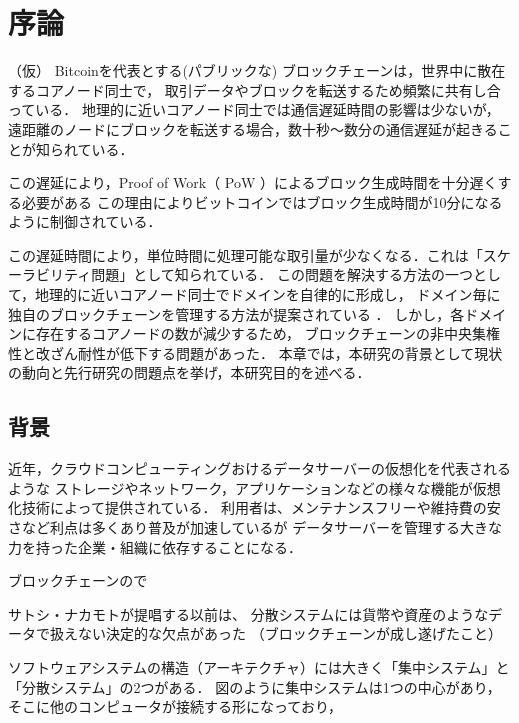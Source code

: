 \documentclass[a4paper,12pt]{jsarticle}
\begin{document}

\section{序論}

（仮）
Bitcoinを代表とする(パブリックな) ブロックチェーンは，世界中に散在するコアノード同士で，
取引データやブロックを転送するため頻繁に共有し合っている．
地理的に近いコアノード同士では通信遅延時間の影響は少ないが，
遠距離のノードにブロックを転送する場合，数十秒〜数分の通信遅延が起きることが知られている．

この遅延により，Proof of Work（ PoW ）によるブロック生成時間を十分遅くする必要がある
この理由によりビットコインではブロック生成時間が10分になるように制御されている．

この遅延時間により，単位時間に処理可能な取引量が少なくなる．これは「スケーラビリティ問題」として知られている． 
この問題を解決する方法の一つとして，地理的に近いコアノード同士でドメインを自律的に形成し，
ドメイン毎に独自のブロックチェーンを管理する方法が提案されている \cite{fujihara1}\cite{fujihara2}．
しかし，各ドメインに存在するコアノードの数が減少するため，
ブロックチェーンの非中央集権性と改ざん耐性が低下する問題があった．
本章では，本研究の背景として現状の動向と先行研究の問題点を挙げ，本研究目的を述べる．


\subsection{背景}
近年，クラウドコンピューティングおけるデータサーバーの仮想化を代表されるような
ストレージやネットワーク，アプリケーションなどの様々な機能が仮想化技術によって提供されている．
利用者は、メンテナンスフリーや維持費の安さなど利点は多くあり普及が加速しているが
データサーバーを管理する大きな力を持った企業・組織に依存することになる．

ブロックチェーンので

サトシ・ナカモトが提唱する以前は、
分散システムには貨幣や資産のようなデータで扱えない決定的な欠点があった
（ブロックチェーンが成し遂げたこと）


ソフトウェアシステムの構造（アーキテクチャ）には大きく「集中システム」と「分散システム」の2つがある．
図のように集中システムは1つの中心があり，そこに他のコンピュータが接続する形になっており，
\end{document}
